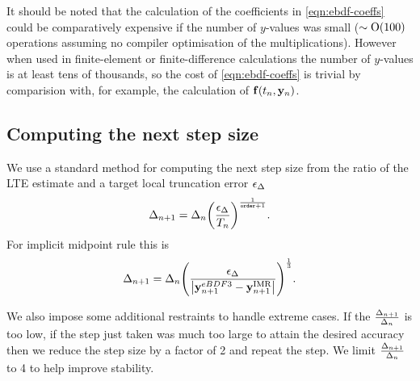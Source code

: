 It should be noted that the calculation of the coefficients in \cref{eqn:ebdf-coeffs} could be comparatively expensive if the number of $y$-values was small ($\sim \text{O}{\left( 100 \right)}$ operations assuming no compiler optimisation of the multiplications).
However when used in finite-element or finite-difference calculations the number of $y$-values is at least tens of thousands, so the cost of \cref{eqn:ebdf-coeffs} is trivial by comparision with, for example, the calculation of ${\mathbf{f}{\left( t_n, \mathbf{y}_n \right)}}$.


\subsection{Computing the next step size}

We use a standard method \cite[pg.268]{GreshoSani} for computing the next step size from the ratio of the LTE estimate and a target local truncation error $\epsilon_{\Delta_{}}$
\begin{equation}
\Delta_{n+1} = \Delta_{n} {\left(  \frac{\epsilon_{\Delta_{}}}{T_n}  \right)}^{\frac{1}{\texttt{order}+1}}.
\end{equation}
For implicit midpoint rule this is
\begin{equation}
  \Delta_{n+1} = \Delta_{n} {\left(  \frac{\epsilon_{\Delta_{}}}{\left|{\mathbf{y}_{n+1}^{eBDF3} - \mathbf{y}_{n+1}^{\text{IMR}}} \right|}  \right)}^{\frac{1}{3}}.
  \label{eq:next-step-dt}
\end{equation}

We also impose some additional restraints to handle extreme cases.
If the $\frac{\Delta_{n+1}}{\Delta_{n}}$ is too low, \ie if the step just taken was much too large to attain the desired accuracy then we reduce the step size by a factor of 2 and repeat the step.
We limit $\frac{\Delta_{n+1}}{\Delta_{n}}$ to 4 to help improve stability.






